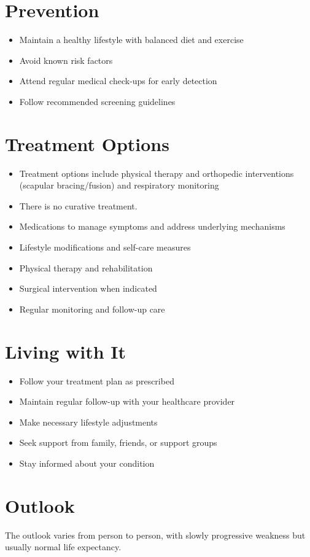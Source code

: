 \section{Prevention}
\begin{itemize}[noitemsep]
  \item Maintain a healthy lifestyle with balanced diet and exercise
  \item Avoid known risk factors
  \item Attend regular medical check-ups for early detection
  \item Follow recommended screening guidelines
\end{itemize}
\section{Treatment Options}
\begin{itemize}[noitemsep]
  \item Treatment options include physical therapy and orthopedic interventions (scapular bracing/fusion) and respiratory monitoring
  \item There is no curative treatment.
  \item Medications to manage symptoms and address underlying mechanisms
  \item Lifestyle modifications and self-care measures
  \item Physical therapy and rehabilitation
  \item Surgical intervention when indicated
  \item Regular monitoring and follow-up care
\end{itemize}
\section{Living with It}
\begin{itemize}[noitemsep]
  \item Follow your treatment plan as prescribed
  \item Maintain regular follow-up with your healthcare provider
  \item Make necessary lifestyle adjustments
  \item Seek support from family, friends, or support groups
  \item Stay informed about your condition
\end{itemize}
\section{Outlook}
The outlook varies from person to person, with slowly progressive weakness but usually normal life expectancy.
